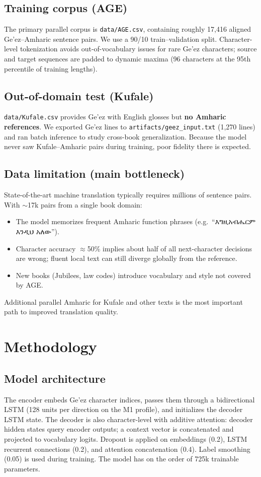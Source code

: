 \documentclass[11pt,a4paper]{article}
\begin{document}
\subsection{Training corpus (AGE)}
The primary parallel corpus is \texttt{data/AGE.csv}, containing roughly 17{,}416 aligned Ge'ez--Amharic sentence pairs. We use a 90/10 train--validation split. Character-level tokenization avoids out-of-vocabulary issues for rare Ge'ez characters; source and target sequences are padded to dynamic maxima (96 characters at the 95th percentile of training lengths).

\subsection{Out-of-domain test (Kufale)}
\texttt{data/Kufale.csv} provides Ge'ez with English glosses but \textbf{no Amharic references}. We exported Ge'ez lines to \texttt{artifacts/geez\_input.txt} (1{,}270 lines) and ran batch inference to study cross-book generalization. Because the model never saw Kufale--Amharic pairs during training, poor fidelity there is expected.

\subsection{Data limitation (main bottleneck)}
State-of-the-art machine translation typically requires millions of sentence pairs. With $\sim$17k pairs from a single book domain:
\begin{itemize}
  \item The model memorizes frequent Amharic function phrases ({\ethiopic e.g.\ ``እግዚአብሔርም እንዲህ አለው''}).
  \item Character accuracy $\approx$50\% implies about half of all next-character decisions are wrong; fluent local text can still diverge globally from the reference.
  \item New books (Jubilees, law codes) introduce vocabulary and style not covered by AGE.
\end{itemize}
Additional parallel Amharic for Kufale and other texts is the most important path to improved translation quality.

\section{Methodology}
\subsection{Model architecture}
The encoder embeds Ge'ez character indices, passes them through a bidirectional LSTM (128 units per direction on the M1 profile), and initializes the decoder LSTM state. The decoder is also character-level with additive attention: decoder hidden states query encoder outputs; a context vector is concatenated and projected to vocabulary logits. Dropout is applied on embeddings (0.2), LSTM recurrent connections (0.2), and attention concatenation (0.4). Label smoothing (0.05) is used during training. The model has on the order of 725k trainable parameters.
\end{document}
